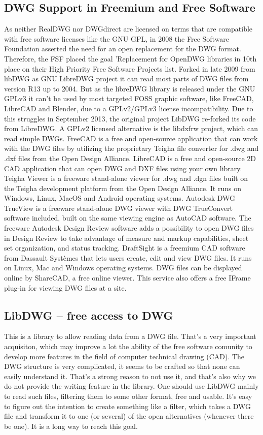 \documentclass[a4paper, 11pt, article]{report}
\begin{document}
{{\subsection{DWG Support in Freemium and Free Software}
As neither RealDWG nor DWGdirect are licensed on terms that are compatible with free software licenses like the GNU GPL, in 2008 the Free Software Foundation asserted the need for an open replacement for the DWG format. Therefore, the FSF placed the goal 'Replacement for OpenDWG libraries in 10th place on their High Priority Free Software Projects list. Forked in late 2009 from libDWG as GNU LibreDWG project it can read most parts of DWG files from version R13 up to 2004. But as the libreDWG library is released under the GNU GPLv3 it can't be used by most targeted FOSS graphic software, like FreeCAD, LibreCAD and Blender, due to a GPLv2/GPLv3 license incompatibility. Due to this struggles in September 2013, the original project LibDWG re-forked its code from LibreDWG. A GPLv2 licensed alternative is the libdxfrw project, which can read simple DWGs. 
FreeCAD is a free and open-source application that can work with the DWG files by utilizing the proprietary Teigha file converter for .dwg and .dxf files from the Open Design Alliance. 
LibreCAD is a free and open-source 2D CAD application that can open DWG and DXF files using your own library.
Teigha Viewer is a freeware stand-alone viewer for .dwg and .dgn files built on the Teigha development platform from the Open Design Alliance. It runs on Windows, Linux, MacOS and Android operating systems.
Autodesk DWG TrueView is a freeware stand-alone DWG viewer with DWG TrueConvert software included, built on the same viewing engine as AutoCAD software. The freeware Autodesk Design Review software adds a possibility to open DWG files in Design Review to take advantage of measure and markup capabilities, sheet set organization, and status tracking.
DraftSight is a freemium CAD software from Dassault Systèmes that lets users create, edit and view DWG files. It runs on Linux, Mac and Windows operating systems. 
DWG files can be displayed online by ShareCAD, a free online viewer. This service also offers a free IFrame plug-in for viewing DWG files at a site.

\subsection{LibDWG – free access to DWG}

This is a library to allow reading data from a DWG file. That's a very important acquisiton, which may improve a lot the ability of the free software comunity to develop more features in the field of computer technical drawing (CAD).
The DWG structure is very complicated, it seems to be crafted so that none can easily understand it. That's a strong reason to not use it, and that's also why we do not provide the writing feature in the library. One should use LibDWG mainly to read such files, filtering them to some other format, free and usable.
It's easy to figure out the intention to create something like a filter, which takes a DWG file and transform it to one (or several) of the open alternatives (whenever there be one). It is a long way to reach this goal.


}}
\end{document}
